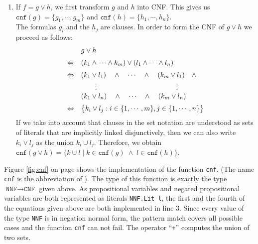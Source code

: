 \begin{enumerate}
\item If $f = g \vee h$, we first transform $g$ and $h$ into CNF.
      This gives us \\[0.2cm]
      \hspace*{1.3cm} 
      $\texttt{cnf}(g) = \{ g_1, \cdots, g_m \}$ \quad and \quad
      $\texttt{cnf}(h) = \{ h_1, \cdots, h_n \}$. \\[0.2cm]
      The formulas $g_i$ and the $h_j$ are clauses.  In order to  form the CNF of $g \vee h$
      we proceed as follows: 
      $$
      \begin{array}[c]{ll}
        & g \vee h \\[0.2cm]
      \Leftrightarrow & (k_1 \wedge \cdots \wedge k_m) \vee (l_1 \wedge \cdots \wedge l_n) \\[0.2cm]
      \Leftrightarrow & (k_1 \vee l_1) \quad \wedge \quad \cdots \quad \wedge \quad (k_m \vee l_1) \quad \wedge \\ 
                      & \qquad \vdots \hspace*{4cm} \vdots \\
                      & (k_1 \vee l_n) \quad \wedge \quad \cdots \quad \wedge \quad (k_m \vee l_n) \\[0.2cm] 
      \Leftrightarrow & \bigl\{ k_i \vee l_j : i \in \{ 1, \cdots, m\}, j \in \{ 1, \cdots, n \} \bigr\} \\ 
      \end{array}
      $$
      If we take into account that clauses in the set notation are understood as sets of
      literals that are implicitly linked disjunctively, then we can also write
      $k_i \vee l_j$ as the union $k_i \cup l_j$.   Therefore, we obtain 
      \\[0.2cm]
      \hspace*{1.3cm} 
      $\texttt{cnf}(g \vee h) = \bigl\{ k \cup l \mid k \in \texttt{cnf}(g) \;\wedge\; l \in \texttt{cnf}(h) \bigr\}$.
\end{enumerate}
Figure \ref{fig:cnf} on page \pageref{fig:cnf} shows the implementation of the function
\texttt{cnf}.
(The name \texttt{cnf} is the abbreviation of ).
The type of this function is exactly the type $\texttt{NNF} \rightarrow \texttt{CNF}$ given above.
As propositional variables and negated propositional variables are both represented as literals
\texttt{NNF.Lit l}, the first and the fourth of the equations given above are both implemented in line 3.
Since every value of the type \texttt{NNF} is in negation normal form, the pattern match covers all possible
cases and the function \texttt{cnf} can not fail.
The operator ``\texttt{+}'' computes the union of two sets.

